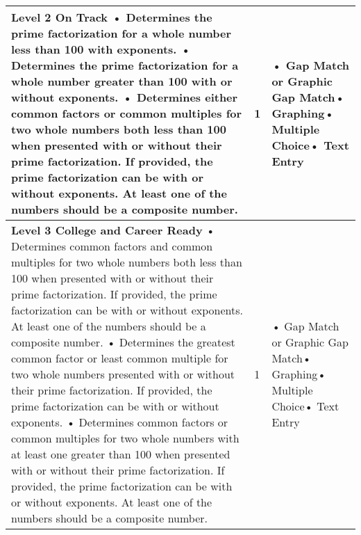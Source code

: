 \documentclass[11pt, English]{article}
\begin{document}
\begin{longtable}{|p{11.0cm}|p{1.8cm}|p{3.7cm}|}
\textbf{Level 2 On Track}\newline
• Determines the prime factorization for a whole number less than 100 with exponents. \newline• Determines the prime factorization for a whole number greater than 100 with or without exponents. \newline• Determines either common factors or common multiples for two whole numbers both less than 100 when presented with or without their prime factorization. If provided, the prime factorization can be with or without exponents. At least one of the numbers should be a composite number. \newline

 & \hfil{1}
 &• Gap Match or Graphic Gap Match\newline• Graphing\newline• Multiple Choice\newline• Text Entry\\
\hline


 
\textbf{Level 3 College and Career Ready}\newline
• Determines common factors and common multiples for two whole numbers both less than 100 when presented with or without their prime factorization. If provided, the prime factorization can be with or without exponents. At least one of the numbers should be a composite number. \newline• Determines the greatest common factor or least common multiple for two whole numbers presented with or without their prime factorization. If provided, the prime factorization can be with or without exponents. \newline• Determines common factors or common multiples for two whole numbers with at least one greater than 100 when presented with or without their prime factorization. If provided, the prime factorization can be with or without exponents. At least one of the numbers should be a composite number. \newline

& \hfil{1}
&• Gap Match or Graphic Gap Match\newline• Graphing\newline• Multiple Choice\newline• Text Entry\\
\hline 


\end{longtable}
\end{document}
